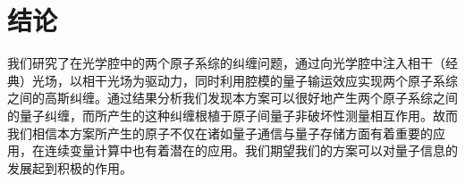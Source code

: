 \vbox{}
\section{结论}
\vbox{}
我们研究了在光学腔中的两个原子系综的纠缠问题，通过向光学腔中注入相干（经典）光场，以相干光场为驱动力，同时利用腔模的量子输运效应实现两个原子系综之间的高斯纠缠。通过结果分析我们发现本方案可以很好地产生两个原子系综之间的量子纠缠，而所产生的这种纠缠根植于原子间量子非破坏性测量相互作用。故而我们相信本方案所产生的原子不仅在诸如量子通信与量子存储方面有着重要的应用，在连续变量计算中也有着潜在的应用。我们期望我们的方案可以对量子信息的发展起到积极的作用。









